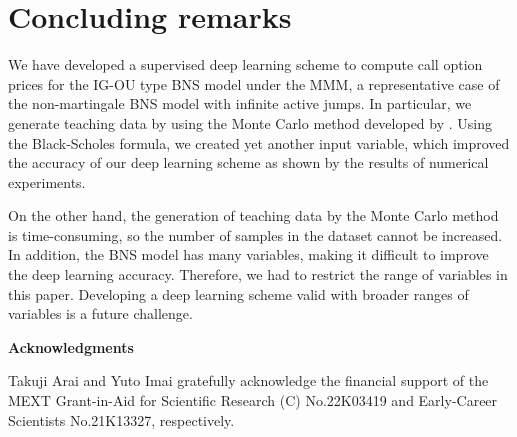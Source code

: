 \section{Concluding remarks}\setcounter{equation}{0}
We have developed a supervised deep learning scheme to compute call option prices for the IG-OU type BNS model under the MMM,
a representative case of the non-martingale BNS model with infinite active jumps.
In particular, we generate teaching data by using the Monte Carlo method developed by \cite{AI}.
Using the Black-Scholes formula, we created yet another input variable, which improved the accuracy of our deep learning scheme
as shown by the results of numerical experiments.

On the other hand, the generation of teaching data by the Monte Carlo method is time-consuming, so the number of samples in the dataset cannot be increased.
In addition, the BNS model has many variables, making it difficult to improve the deep learning accuracy.
Therefore, we had to restrict the range of variables in this paper.
Developing a deep learning scheme valid with broader ranges of variables is a future challenge.

\begin{center}{\bf Acknowledgments}\end{center}
Takuji Arai and Yuto Imai gratefully acknowledge the financial support of the MEXT Grant-in-Aid for
Scientific Research (C) No.22K03419 and Early-Career Scientists No.21K13327, respectively.

